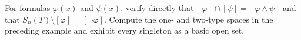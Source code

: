 \begin{exercise}
\label{ex:types-ultraproducts-01}
\label{ex:type-space-basis}
For formulas \(\varphi(\bar x)\) and \(\psi(\bar x)\), verify directly that
\([\varphi]\cap[\psi]=[\varphi\land\psi]\) and that
\(S_n(T)\setminus[\varphi]=[\neg\varphi]\).  Compute the one- and two-type
spaces in the preceding example and exhibit every singleton as a basic open
set.
\end{exercise}


